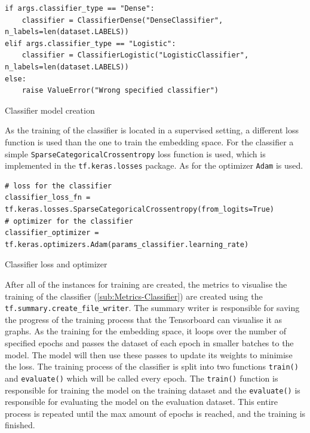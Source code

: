 \begin{code}[htbp]
\begin{verbatim}
if args.classifier_type == "Dense":
    classifier = ClassifierDense("DenseClassifier", n_labels=len(dataset.LABELS))
elif args.classifier_type == "Logistic":
    classifier = ClassifierLogistic("LogisticClassifier", n_labels=len(dataset.LABELS))
else:
    raise ValueError("Wrong specified classifier")
\end{verbatim}
\caption{Classifier model creation}
\label{code:Classifier-Model-Creation}
\end{code}
\noindent
As the training of the classifier is located in a supervised setting, a different loss function is used than the one to train the embedding space. For the classifier a simple \texttt{SparseCategoricalCrossentropy} loss function is used, which is implemented in the \texttt{tf.keras.losses} package. As for the optimizer \texttt{Adam} is used.

\begin{code}[htbp]
\begin{verbatim}
# loss for the classifier
classifier_loss_fn = tf.keras.losses.SparseCategoricalCrossentropy(from_logits=True)
# optimizer for the classifier
classifier_optimizer = tf.keras.optimizers.Adam(params_classifier.learning_rate)
\end{verbatim}
\caption{Classifier loss and optimizer}
\label{code:Classifier-Loss-Optimizer}
\end{code}
\noindent
After all of the instances for training are created, the metrics to visualise the training of the classifier (\ref{sub:Metrics-Classifier}) are created using the \texttt{tf.summary.create\_file\_writer}. The summary writer is responsible for saving the progress of the training process that the Tensorboard can visualise it as graphs. 
\newline
\newline
As the training for the embedding space, it loops over the number of specified epochs and passes the dataset of each epoch in smaller batches to the model. The model will then use these passes to update its weights to minimise the loss. The training process of the classifier is split into two functions \texttt{train()} and \texttt{evaluate()} which will be called every epoch. The \texttt{train()} function is responsible for training the model on the training dataset and the \texttt{evaluate()} is responsible for evaluating the model on the evaluation dataset. This entire process is repeated until the max amount of epochs is reached, and the training is finished.

